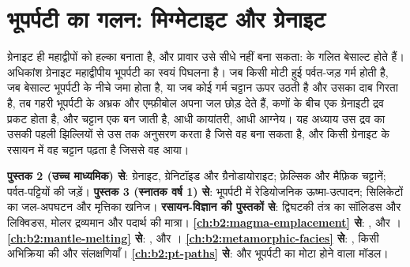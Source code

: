 \chapter{भूपर्पटी का गलन: मिग्मेटाइट और ग्रेनाइट}\label{ch:b2:crustal-melting}

ग्रेनाइट ही महाद्वीपों को हल्का बनाता है, और प्रावार उसे सीधे नहीं बना सकता: 
के गलित बेसाल्ट होते हैं। अधिकांश ग्रेनाइट महाद्वीपीय भूपर्पटी का स्वयं पिघलना है।
जब किसी मोटी हुई पर्वत-जड़ गर्म होती है, जब बेसाल्ट भूपर्पटी के नीचे जमा होता है, या जब कोई गर्म
चट्टान ऊपर उठती है और उसका दाब गिरता है, तब गहरी भूपर्पटी के अभ्रक और एम्फ़ीबोल
अपना जल छोड़ देते हैं, कणों के बीच एक ग्रेनाइटी द्रव प्रकट होता है, और चट्टान एक
 बन जाती है, आधी कायांतरी, आधी आग्नेय। यह अध्याय उस द्रव का उसकी पहली
झिल्लियों से उस  तक अनुसरण करता है जिसे वह बना सकता है, और किसी ग्रेनाइट के रसायन में वह चट्टान पढ़ता है जिससे वह
आया।

\begin{recall}
\textbf{पुस्तक 2 (उच्च माध्यमिक) से}: ग्रेनाइट, ग्रेनिटॉइड और ग्रैनोडायोराइट; फ़ेल्सिक और मैफ़िक
चट्टानें; पर्वत-पट्टियों की जड़ें। \textbf{पुस्तक 3 (स्नातक वर्ष 1) से}: भूपर्पटी में रेडियोजनिक ऊष्मा-उत्पादन;
सिलिकेटों का जल-अपघटन और मृत्तिका खनिज। \textbf{रसायन-विज्ञान की पुस्तकों से}: द्विघटकी तंत्र का सॉलिडस और लिक्विडस,
मोलर द्रव्यमान और पदार्थ की मात्रा। \textbf{\cref{ch:b2:magma-emplacement}
से}: ,  और । \textbf{\cref{ch:b2:mantle-melting}
से}: ,  और । \textbf{\cref{ch:b2:metamorphic-facies} से}: , किसी अभिक्रिया की  और संलक्षणियाँ। \textbf{\cref{ch:b2:pt-paths} से}:  और
भूपर्पटी का मोटा होने वाला मॉडल।
\end{recall}

